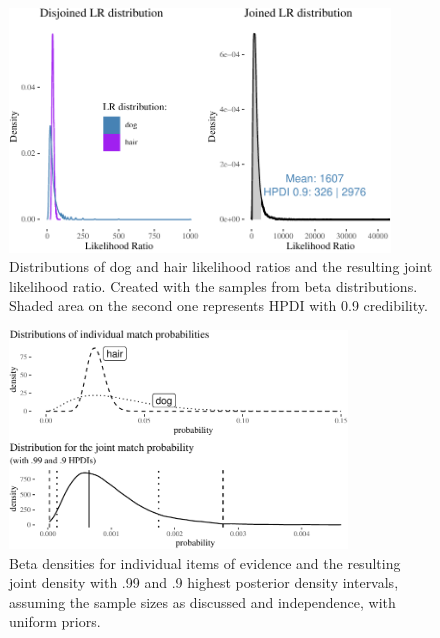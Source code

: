 \documentclass[
  letterpaper,
  DIV=11,
  numbers=noendperiod]{scrartcl}
\begin{document}
\begin{figure}[H]

{\centering \includegraphics[width=0.9\textwidth,height=\textheight]{imp_philosophical_files/figure-pdf/fig-lrdens-1.pdf}

}

\caption{\label{fig-lrdens}Distributions of dog and hair likelihood
ratios and the resulting joint likelihood ratio. Created with the
samples from beta distributions. Shaded area on the second one
represents HPDI with 0.9 credibility.}

\end{figure}

\begin{figure}[H]

{\centering \includegraphics[width=0.8\textwidth,height=\textheight]{imp_philosophical_files/figure-pdf/fig-densities-1.pdf}

}

\caption{\label{fig-densities}Beta densities for individual items of
evidence and the resulting joint density with .99 and .9 highest
posterior density intervals, assuming the sample sizes as discussed and
independence, with uniform priors.}

\end{figure}
\end{document}
